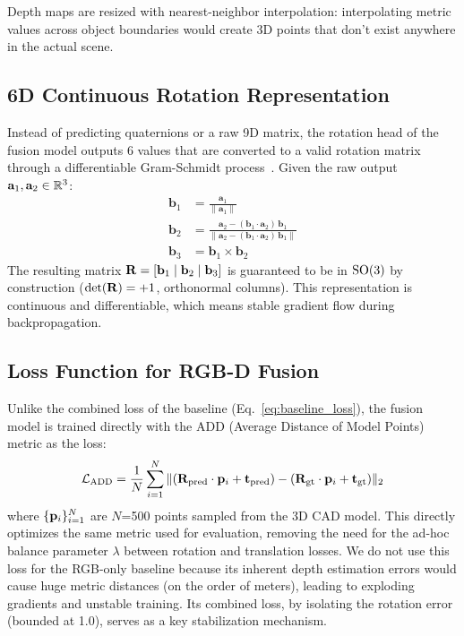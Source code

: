Depth maps are resized with nearest-neighbor interpolation: interpolating metric values across object boundaries would create 3D points that don't exist anywhere in the actual scene.

\subsection{6D Continuous Rotation Representation}
\label{sec:method_rotation6d}

Instead of predicting quaternions or a raw 9D matrix, the rotation head of the fusion model outputs 6 values that are converted to a valid rotation matrix through a differentiable Gram-Schmidt process~\cite{zhou2019continuity}. Given the raw output $\mathbf{a}_1, \mathbf{a}_2 \in \mathbb{R}^3$:
\begin{align}
    \mathbf{b}_1 &= \frac{\mathbf{a}_1}{\|\mathbf{a}_1\|} \label{eq:gs1} \\[3pt]
    \mathbf{b}_2 &= \frac{\mathbf{a}_2 - (\mathbf{b}_1 \cdot \mathbf{a}_2)\,\mathbf{b}_1}{\|\mathbf{a}_2 - (\mathbf{b}_1 \cdot \mathbf{a}_2)\,\mathbf{b}_1\|} \label{eq:gs2} \\[3pt]
    \mathbf{b}_3 &= \mathbf{b}_1 \times \mathbf{b}_2 \label{eq:gs3}
\end{align}
The resulting matrix $\mathbf{R} = [\mathbf{b}_1 \mid \mathbf{b}_2 \mid \mathbf{b}_3]$ is guaranteed to be in $\mathrm{SO}(3)$ by construction ($\det(\mathbf{R}) = +1$, orthonormal columns). This representation is continuous and differentiable, which means stable gradient flow during backpropagation.

\subsection{Loss Function for RGB-D Fusion}
\label{sec:method_add_loss}

Unlike the combined loss of the baseline (Eq.~\ref{eq:baseline_loss}), the fusion model is trained directly with the ADD (Average Distance of Model Points) metric as the loss:
\begin{equation}
    \mathcal{L}_{\text{ADD}} = \frac{1}{N} \sum_{i=1}^{N} \|(\mathbf{R}_{\text{pred}} \cdot \mathbf{p}_i + \mathbf{t}_{\text{pred}}) - (\mathbf{R}_{\text{gt}} \cdot \mathbf{p}_i + \mathbf{t}_{\text{gt}})\|_2
    \label{eq:add_loss}
\end{equation}
where $\{\mathbf{p}_i\}_{i=1}^N$ are $N$=500 points sampled from the 3D CAD model. This directly optimizes the same metric used for evaluation, removing the need for the ad-hoc balance parameter $\lambda$ between rotation and translation losses. We do not use this loss for the RGB-only baseline because its inherent depth estimation errors would cause huge metric distances (on the order of meters), leading to exploding gradients and unstable training. Its combined loss, by isolating the rotation error (bounded at 1.0), serves as a key stabilization mechanism.

